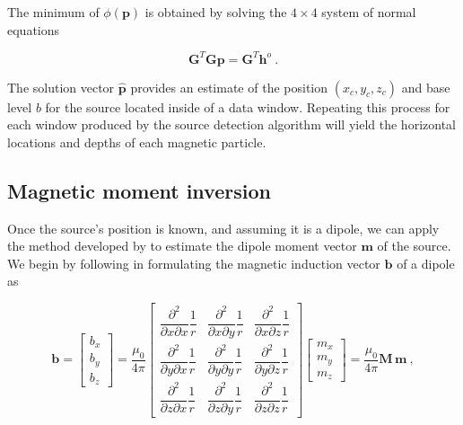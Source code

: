 The minimum of $\phi(\mathbf{p})$ is obtained by solving the $4 \times 4$
system of normal equations

\begin{equation}
\mathbf{G}^T \mathbf{G} \mathbf{p} = \mathbf{G}^T \mathbf{h}^o\ .
\end{equation}

The solution vector $\hat{\mathbf{p}}$ provides an estimate of the position
$(x_c, y_c, z_c)$ and base level $b$ for the source located inside of a data
window. Repeating this process for each window produced by the source detection
algorithm will yield the horizontal locations and depths of each magnetic
particle.

\subsection{Magnetic moment inversion}

Once the source's position is known, and assuming it is a dipole, we can apply the method developed by
\citet{Oliveira2015Estimation} to estimate the dipole moment vector
$\mathbf{m}$ of the source. We begin by following
\citet{Oliveira2015Estimation} in formulating the magnetic induction vector
$\mathbf{b}$ of a dipole as

\begin{equation}
\label{eq_vector_dipole_field}
\mathbf{b}
=
\begin{bmatrix}
  b_x \\ b_y \\ b_z
\end{bmatrix}
= \dfrac{\mu_0}{4\pi}
\begin{bmatrix}
    \dfrac{\partial^2}{\partial x \partial x} \dfrac{1}{r}
  & \dfrac{\partial^2}{\partial x \partial y} \dfrac{1}{r}
  & \dfrac{\partial^2}{\partial x \partial z} \dfrac{1}{r}
  \\
    \dfrac{\partial^2}{\partial y \partial x} \dfrac{1}{r}
  & \dfrac{\partial^2}{\partial y \partial y} \dfrac{1}{r}
  & \dfrac{\partial^2}{\partial y \partial z} \dfrac{1}{r}
  \\
  \dfrac{\partial^2}{\partial z \partial x} \dfrac{1}{r}
  & \dfrac{\partial^2}{\partial z \partial y} \dfrac{1}{r}
  & \dfrac{\partial^2}{\partial z \partial z} \dfrac{1}{r}
\end{bmatrix}
\begin{bmatrix}
  m_x \\ m_y \\ m_z
\end{bmatrix}
= \dfrac{\mu_0}{4\pi} \mathbf{M}\,\mathbf{m}
\ ,
\end{equation}

